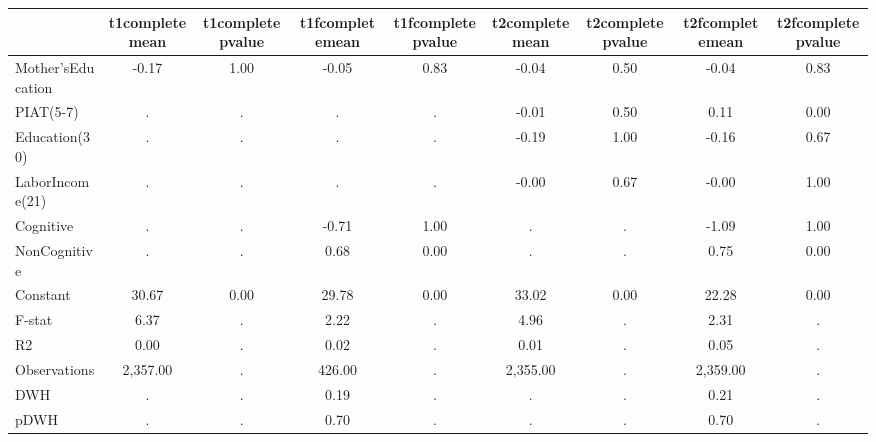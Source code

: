 \begin{table}[htbp]
\begin{tabular}{lcccccccc} \hline \hline
 & t1completemean  & t1completepvalue  & t1fcompletemean  & t1fcompletepvalue  & t2completemean  & t2completepvalue  & t2fcompletemean  & t2fcompletepvalue  \\  \hline 
Mother'sEducation &        -0.17 &         1.00 &        -0.05 &         0.83 &        -0.04 &         0.50 &        -0.04 &         0.83 \\  
PIAT(5-7) &            . &            . &            . &            . &        -0.01 &         0.50 &         0.11 &         0.00 \\  
Education(30) &            . &            . &            . &            . &        -0.19 &         1.00 &        -0.16 &         0.67 \\  
LaborIncome(21) &            . &            . &            . &            . &        -0.00 &         0.67 &        -0.00 &         1.00 \\  
Cognitive &            . &            . &        -0.71 &         1.00 &            . &            . &        -1.09 &         1.00 \\  
NonCognitive &            . &            . &         0.68 &         0.00 &            . &            . &         0.75 &         0.00 \\  
Constant &        30.67 &         0.00 &        29.78 &         0.00 &        33.02 &         0.00 &        22.28 &         0.00 \\  
F-stat &         6.37 &            . &         2.22 &            . &         4.96 &            . &         2.31 &            . \\  
R2 &         0.00 &            . &         0.02 &            . &         0.01 &            . &         0.05 &            . \\  
Observations &     2,357.00 &            . &       426.00 &            . &     2,355.00 &            . &     2,359.00 &            . \\  
DWH &            . &            . &         0.19 &            . &            . &            . &         0.21 &            . \\  
pDWH &            . &            . &         0.70 &            . &            . &            . &         0.70 &            . \\  
\hline \hline \end{tabular}
\end{table}
